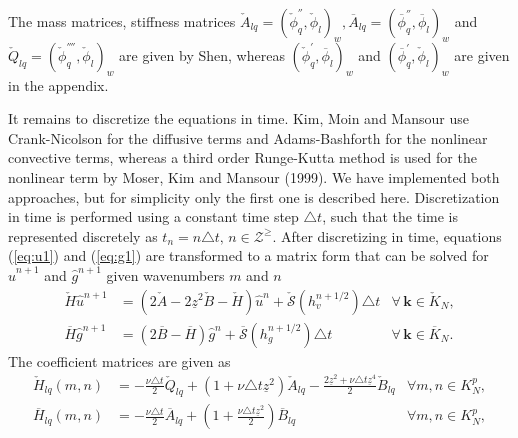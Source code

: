\documentclass[11pt, oneside]{article}
\newcommand{\N}[1]{\check{#1}}
\newcommand{\D}[1]{\overline{#1}}
\begin{document}
The mass matrices, stiffness matrices $\N{A}_{lq} = \left( \N{\phi}_q^{''}, 
\N{\phi}_l\right)_w, 
\D{A}_{lq} = \left( \D{\phi}_q^{''}, \D{\phi}_l\right)_w 
$ and $\N{Q}_{lq} = \left(\N{\phi}^{''''}_q, \N{\phi}_l\right)_w$ are given by 
Shen, whereas $\left(\N{\phi}_q^{'}, \D{\phi}_l\right)_w$ and 
$\left(\D{\phi}_q^{'}, \N{\phi}_l\right)_w$ are given in the 
appendix.

It remains to discretize the equations in time. Kim, Moin and Mansour use 
Crank-Nicolson for the diffusive terms and Adams-Bashforth for the nonlinear 
convective terms, whereas a third order Runge-Kutta method is used for the 
nonlinear term by Moser, Kim and Mansour (1999). We have implemented both 
approaches, but for simplicity only the first one is described here. 
Discretization in time is performed using a constant time step $\triangle t$, 
such that the time is represented discretely as $t_n = n \triangle t, \, n \in 
\mathcal{Z}^{\ge}$. After 
discretizing in time, equations (\ref{eq:u1}) and (\ref{eq:g1}) are transformed 
to a matrix form that can be solved for $\hat{u}^{n+1}$ and $\hat{g}^{n+1}$ 
given wavenumbers $m$ and $n$
\begin{align}
\N{H}\hat{u}^{n+1} & = \left(2\N{A} - 2\underline{z}^2\N{B} - \N{H} 
\right)\hat{u}^{n} + \N{\mathcal{S}}(h_v^{n+1/2}) \triangle t & 
\forall \, {\bm{k}} \in \N{K}_N, 
\label{eq:ufin}\\ 
\D{H} \hat{g}^{n+1} &= \left(2 \D{B}-\D{H}\right) 
\hat{g}^{n} + \D{\mathcal{S}}(h_g^{n+1/2}) \triangle t &\forall \, 
{\bm{k}} \in 
\D{K}_N. \label{eq:gfin}
\end{align}
The coefficient matrices are given as
\begin{align}
\N{H}_{lq}(m, n) &= -\frac{\nu \triangle t}{2}\N{Q}_{lq} + \left( 1 + \nu 
\triangle t 
\underline{z}^2 \right) \N{A}_{lq} - \frac{2\underline{z}^2 + \nu \triangle t 
\underline{z}^4}{2} \N{B}_{lq} &\forall m, n \in K_N^p, 
\label{eq:Biharmonic_matrix} \\
\D{H}_{lq}(m, n) &= -\frac{\nu \triangle 
t}{2}\D{A}_{lq} + (1 + \frac{\nu \triangle t \underline{z}^2}{2}) \D{B}_{lq} 
&\forall m, n \in K_N^p, \label{eq:Helmholtz_matrix}
\end{align}
\end{document}
